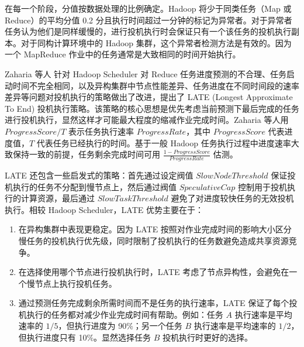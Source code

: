 在每一个阶段，分值按数据处理的比例确定。Hadoop 将少于同类任务（Map 或 Reduce）的平均分值 0.2 分且执行时间超过一分钟的标记为异常者。对于异常者任务认为他们是同样缓慢的，进行投机执行时会保证只有一个该任务的投机执行副本。对于同构计算环境中的 Hadoop 集群，这个异常者检测方法是有效的。因为一个 MapReduce 作业中的任务通常是大致相同的时间开始执行。
                                                                                                                                                                                                                                                                                                                                                                                       
Zaharia 等人 \cite{Zaharia:2008:IMP:1855741.1855744} 针对 Hadoop Scheduler 对 Reduce 任务进度预测的不合理、任务启动时间不完全相同，以及异构集群中节点性能差异、任务进度在不同时间段的速率差异等问题对投机执行的策略做出了改进，提出了 LATE (Longest Approximate To End) 投机执行策略。该策略的核心思想是优先考虑当前预测下最后完成的任务进行投机执行，显然这样才可能最大程度的缩减作业完成时间。Zaharia 等人用 $ProgressScore / T$ 表示任务执行速率 $ProgressRate$，其中 $ProgressScore$ 代表进度值，$T$ 代表任务已经执行的时间。基于一般 Hadoop 任务执行过程中进度速率大致保持一致的前提，任务剩余完成时间可用 $\frac{1 - ProgressScore}{ProgressRate}$ 估测。

LATE \cite{Zaharia:2008:IMP:1855741.1855744} 还包含一些启发式的策略：首先通过设定阀值 $SlowNodeThreshold$ 保证投机执行的任务不分配到慢节点上，然后通过阀值 $SpeculativeCap$ 控制用于投机执行的计算资源，最后通过 $SlowTaskThreshold$ 避免了对进度较快任务的无效投机执行。相较 Hadoop Scheduler，LATE 优势主要在于：
\begin{enumerate}
\item 在异构集群中表现更稳定。因为 LATE 按照对作业完成时间的影响大小区分慢任务的投机执行优先级，同时限制了投机执行的任务数避免造成共享资源竞争。
\item 在选择使用哪个节点进行投机执行时，LATE 考虑了节点异构性，会避免在一个慢节点上执行投机任务。
\item 通过预测任务完成剩余所需时间而不是任务的执行速率，LATE 保证了每个投机执行的任务都对减少作业完成时间有帮助。例如：任务 $A$ 执行速率是平均速率的 $1/5$，但执行进度为 90\%；另一个任务 $B$ 执行速率是平均速率的 $1/2$，但执行进度只有 10\%。显然选择任务 $B$ 投机执行时更好的选择。
\end{enumerate}

